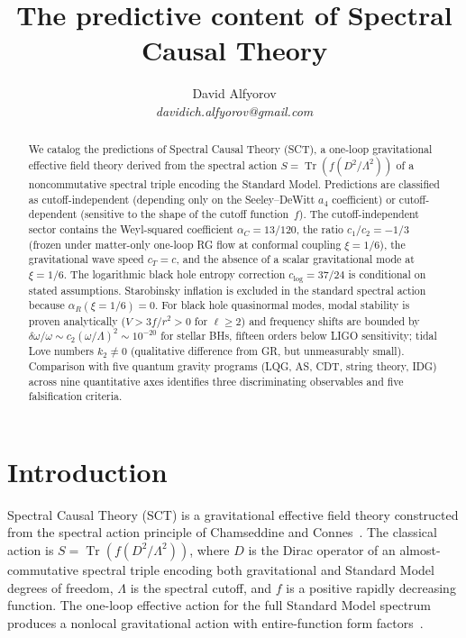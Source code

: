 \documentclass[12pt,a4paper]{article}
\title{The predictive content of Spectral Causal Theory}
\author{David Alfyorov\\[4pt]
\small\textit{davidich.alfyorov@gmail.com}}
\date{}
\theoremstyle{plain}
\theoremstyle{definition}
\theoremstyle{remark}
\newcommand{\Tr}{\operatorname{Tr}}
\begin{document}
\maketitle

\begin{abstract}

We catalog the predictions of Spectral Causal Theory (SCT), a
one-loop gravitational effective field theory derived from the
spectral action $S = \Tr(f(D^2/\Lambda^2))$ of a noncommutative
spectral triple encoding the Standard Model.  Predictions are
classified as cutoff-independent (depending only on the
Seeley--DeWitt $a_4$ coefficient) or cutoff-dependent (sensitive
to the shape of the cutoff function~$f$).  The
cutoff-independent sector contains the Weyl-squared
coefficient $\alpha_C = 13/120$, the ratio
$c_1/c_2 = -1/3$ (frozen under matter-only one-loop RG flow at
conformal coupling $\xi = 1/6$), the gravitational wave
speed $c_T = c$, and the absence of a scalar gravitational
mode at $\xi = 1/6$.  The logarithmic black hole entropy correction
$c_{\log} = 37/24$ is conditional on stated assumptions.
Starobinsky inflation is excluded in the standard spectral
action because $\alpha_R(\xi = 1/6) = 0$.  For black hole quasinormal modes, modal stability is proven
analytically ($V > 3f/r^2 > 0$ for $\ell \geq 2$) and frequency
shifts are bounded by $\delta\omega/\omega \sim c_2(\omega/\Lambda)^2
\sim 10^{-20}$ for stellar BHs, fifteen orders below LIGO sensitivity;
tidal Love numbers $k_2 \neq 0$ (qualitative difference from GR, but
unmeasurably small). Comparison with five quantum gravity programs
(LQG, AS, CDT, string theory, IDG) across nine quantitative axes
identifies three discriminating observables and five falsification
criteria.

\end{abstract}

\tableofcontents
\newpage

\section{Introduction}
\label{sec:intro}

Spectral Causal Theory (SCT) is a gravitational effective field
theory constructed from the spectral action principle of
Chamseddine and Connes~\cite{CC:1996,CC:1997}.  The classical
action is $S = \Tr(f(D^2/\Lambda^2))$, where $D$ is the Dirac
operator of an almost-commutative spectral triple encoding both
gravitational and Standard Model degrees of freedom, $\Lambda$
is the spectral cutoff, and $f$ is a positive rapidly decreasing
function.  The one-loop effective action for the full Standard
Model spectrum produces a nonlocal gravitational action with
entire-function form factors~\cite{Alfyorov:2026paper1}.
\end{document}
